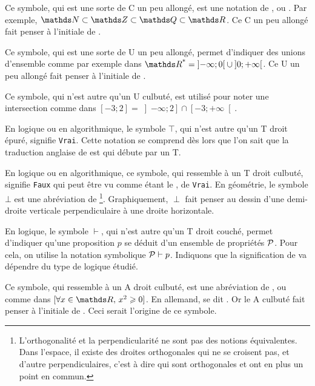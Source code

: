 
\cadre{$\subset$} Ce symbole, qui est une sorte de C un peu allongé, est une notation
de , ou . Par exemple, 
$\NN \subset \ZZ \subset \QQ \subset \RR$. Ce C un peu allongé fait penser à l'initiale
de .


\cadre{$\cup$} Ce symbole, qui est une sorte de U un peu allongé, permet d'indiquer
des unions d'ensemble comme par exemple dans 
$\RR^\text{*} = \left] -\infty ; 0 \right[ \cup \left] 0 ; +\infty \right[$.
Ce U un peu allongé fait penser à l'initiale de .


\cadre{$\cap$} Ce symbole, qui n'est autre qu'un U culbuté, est utilisé pour noter une intersection comme dans
$\left[ -3 ; 2 \right] = \left] -\infty ; 2 \right] \cap \left[ -3 ; +\infty \right[$.


\cadre{$\top$} En logique ou en algorithmique, le symbole $\top$, qui n'est autre qu'un T droit épuré, signifie \verb+Vrai+. Cette notation se comprend dès lors que l'on sait que la traduction anglaise de  est  qui débute par un T.


\cadre{$\perp$} 
En logique ou en algorithmique, ce symbole, qui ressemble à un T droit culbuté, signifie \verb+Faux+ qui peut être vu comme étant le ,  de \verb+Vrai+.
En géométrie, le symbole $\bot$ est une abréviation de  
\footnote{
	L'orthogonalité et la perpendicularité ne sont pas des notions équivalentes. Dans l'espace, il existe des droites orthogonales qui ne se croisent pas, et d'autre perpendiculaires, c'est à dire qui sont orthogonales et ont en plus un point en commun.
}.
Graphiquement, $\perp$ fait penser au dessin d'une demi-droite verticale perpendiculaire à une droite horizontale.


\cadre{$\vdash$} En logique, le symbole $\vdash$, qui n'est autre qu'un T droit couché, permet d'indiquer qu'une proposition $p$ se déduit d'un ensemble de propriétés $\cal P$. Pour cela, on utilise la notation symbolique ${\cal P} \vdash p$. Indiquons que la signification de  va dépendre du type de logique étudié.


\cadre{$\forall$} Ce symbole, qui ressemble à un A droit culbuté, est une abréviation
de , ou  comme dans
$ [ \forall x \in \RR, \, x^2 \geq 0 ] $. En allemand,  se dit .
Or le A culbuté fait penser à l'initiale de . Ceci serait l'origine
de ce symbole.


